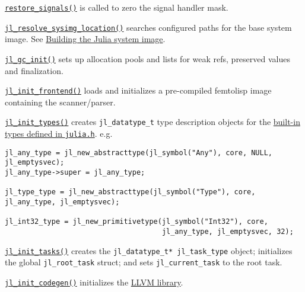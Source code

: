 \href{https://github.com/JuliaLang/julia/blob/master/src/signals-unix.c}{\texttt{restore\_signals()}} is called to zero the signal handler mask.



\href{https://github.com/JuliaLang/julia/blob/master/src/init.c}{\texttt{jl\_resolve\_sysimg\_location()}} searches configured paths for the base system image. See \hyperlink{15513456349900674098}{Building the Julia system image}.



\href{https://github.com/JuliaLang/julia/blob/master/src/gc.c}{\texttt{jl\_gc\_init()}} sets up allocation pools and lists for weak refs, preserved values and finalization.



\href{https://github.com/JuliaLang/julia/blob/master/src/ast.c}{\texttt{jl\_init\_frontend()}} loads and initializes a pre-compiled femtolisp image containing the scanner/parser.



\href{https://github.com/JuliaLang/julia/blob/master/src/jltypes.c}{\texttt{jl\_init\_types()}} creates \texttt{jl\_datatype\_t} type description objects for the \href{https://github.com/JuliaLang/julia/blob/master/src/julia.h}{built-in types defined in \texttt{julia.h}}. e.g.




\begin{lstlisting}
jl_any_type = jl_new_abstracttype(jl_symbol("Any"), core, NULL, jl_emptysvec);
jl_any_type->super = jl_any_type;

jl_type_type = jl_new_abstracttype(jl_symbol("Type"), core, jl_any_type, jl_emptysvec);

jl_int32_type = jl_new_primitivetype(jl_symbol("Int32"), core,
                                     jl_any_type, jl_emptysvec, 32);
\end{lstlisting}



\href{https://github.com/JuliaLang/julia/blob/master/src/task.c}{\texttt{jl\_init\_tasks()}} creates the \texttt{jl\_datatype\_t* jl\_task\_type} object; initializes the global \texttt{jl\_root\_task} struct; and sets \texttt{jl\_current\_task} to the root task.



\href{https://github.com/JuliaLang/julia/blob/master/src/codegen.cpp}{\texttt{jl\_init\_codegen()}} initializes the \href{https://llvm.org}{LLVM library}.



